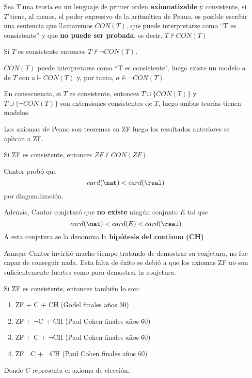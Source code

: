 \begin{theorem}
Sea $T$ una teoría en un lenguaje de primer orden \textbf{axiomatizable} y consistente, si $T$ tiene, al menos, el poder expresivo de la aritmética de Peano, es posible escribir una sentencia que llamaremos $CON(T)$, que puede interpretarse como ``T es consistente'' y que \textbf{no puede ser probada}, es decir, $T \nvdash CON(T)$
\end{theorem}

\begin{obs}
Si $T$ es consistente entonces $T \nvdash \neg CON(T)$.

$CON(T)$ puede interpretarse como ``T es consistente", luego existe un modelo $a$ de $T$ con $a \vDash CON(T)$ y, por tanto, $a \nvDash \neg CON(T)$.

En consecuencia, si $T$ es consistente, entonces $T \cup \{ CON(T)\}$ y $T\cup \{\neg CON(T)\}$ son extensiones consistentes de $T$, luego ambas teorías tienen modelos.

\end{obs}

\begin{obs}
Los axiomas de Peano son teoremas en ZF luego los resultados anteriores se aplican a ZF.
\end{obs}

\begin{theorem}
Si ZF es consistente, entonces $ZF \nvdash CON(ZF)$
\end{theorem}

\begin{theorem}
Cantor probó que
\[card(\nat) < card(\real)\]
por diagonalización.

Además, Cantor conjeturó que \textbf{no existe} ningún conjunto $E$ tal que
\[card(\nat) < card(E) < card(\real)\]
A esta conjetura se la denomina la \textbf{hipótesis del continuo (CH)}
\end{theorem}

Aunque Cantor invirtió mucho tiempo tratando de demostrar su conjetura, no fue capaz de conseguir nada. Esta falta de éxito se debió a que los axiomas ZF no son suficientemente fuertes como para demostrar la conjetura.

\begin{theorem}
Si ZF es consistente, entonces también lo son:
\begin{enumerate}
\item ZF + C + CH (Gödel finales años 30)
\item ZF + $\neg$C + CH (Paul Cohen finales años 60)
\item ZF + C + $\neg$CH (Paul Cohen finales años 60)
\item ZF $\neg$C + $\neg$CH (Paul Cohen finales años 60)
\end{enumerate}

Donde $C$ representa el axioma de elección.
\end{theorem}

